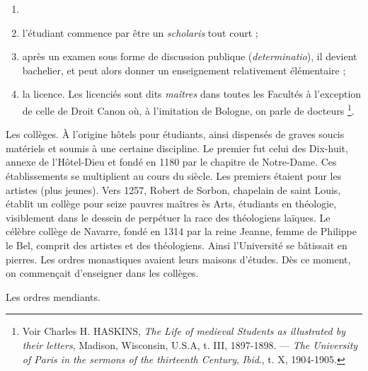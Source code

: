 \documentclass[french,twoside]{book} %
\begin{document}
\begin{enumerate}[itemsep=0pt,]
\item[] \hspace{-1.5em}{\bfseries Les degrés :}
\item l’étudiant commence par être un {\itshape scholaris} tout court ;
\item après un examen sous forme de discussion publique ({\itshape determinatio}), il devient bachelier, et peut alors donner un enseignement relativement élémentaire ;
\item la licence. Les licenciés sont dits \emph{maîtres} dans toutes les Facultés à l’exception de celle de Droit Canon où, à l’imitation de Bologne, on parle de docteurs \footnote{ Voir Charles H. HASKINS, {\itshape The Life of medieval Students as illustrated by their letters}, Madison, Wisconsin, U.S.A, t. III, 1897-1898. — {\itshape The University of Paris in the sermons of the thirteenth Century}, {\itshape Ibid}., t. X, 1904-1905.}.

\end{enumerate}\noindent Les collèges. À l’origine hôtels pour étudiants, ainsi dispensés de graves soucis matériels et soumis à une certaine discipline. Le premier fut celui des Dix-huit, annexe de l’Hôtel-Dieu et fondé en 1180 par le chapitre de Notre-Dame. Ces établissements se multiplient au cours du siècle. Les premiers étaient pour les artistes (plus jeunes). Vers 1257, Robert de Sorbon, chapelain de saint Louis, établit un collège pour seize pauvres maîtres ès Arts, étudiants en théologie, visiblement dans le dessein de perpétuer la race des théologiens laïques. Le célèbre collège de Navarre, fondé en 1314 par la reine Jeanne, femme de Philippe le Bel, comprit des artistes et des théologiens. Ainsi l’Université se bâtissait en pierres. Les ordres monastiques avaient leurs maisons d’études. Dès ce moment, on commençait d’enseigner dans les collèges.\par
Les ordres mendiants.\par
\end{document}
